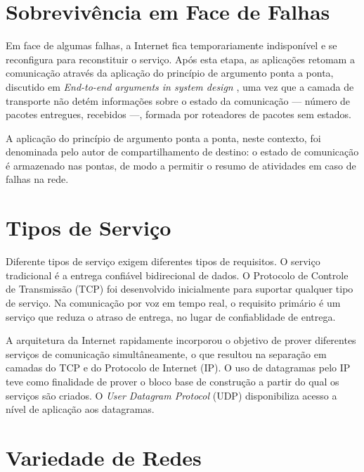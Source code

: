 \section*{Sobrevivência em Face de Falhas}

Em face de algumas falhas, a Internet fica temporariamente indisponível e se reconfigura para reconstituir o serviço. Após esta etapa, as aplicações retomam a comunicação através da aplicação do princípio de argumento ponta a ponta, discutido em \emph{End-to-end arguments in system design} \cite{saltzer1984end}, uma vez que a camada de transporte não detém informações sobre o estado da comunicação --- número de pacotes entregues, recebidos ---, formada por roteadores de pacotes sem estados.

A aplicação do princípio de argumento ponta a ponta, neste contexto, foi denominada pelo autor de compartilhamento de destino: o estado de comunicação é armazenado nas pontas, de modo a permitir o resumo de atividades em caso de falhas na rede.


\section*{Tipos de Serviço}

Diferente tipos de serviço exigem diferentes tipos de requisitos. O serviço tradicional é a entrega confiável bidirecional de dados. O Protocolo de Controle de Transmissão (TCP) foi desenvolvido inicialmente para suportar qualquer tipo de serviço. Na comunicação por voz em tempo real, o requisito primário é um serviço que reduza o atraso de entrega, no lugar de confiablidade de entrega.

A arquitetura da Internet rapidamente incorporou o objetivo de prover diferentes serviços de comunicação simultâneamente, o que resultou na separação em camadas do TCP e do Protocolo de Internet (IP). O uso de datagramas pelo IP teve como finalidade de prover o bloco base de construção a partir do qual os serviços são criados. O \textit{User Datagram Protocol} (UDP) disponibiliza acesso a nível de aplicação aos datagramas.


\section*{Variedade de Redes}

